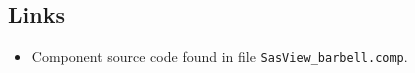 \subsection*{Links}
\begin{itemize}
  \item Component source code found in file \texttt{SasView\_barbell.comp}.
\end{itemize}
